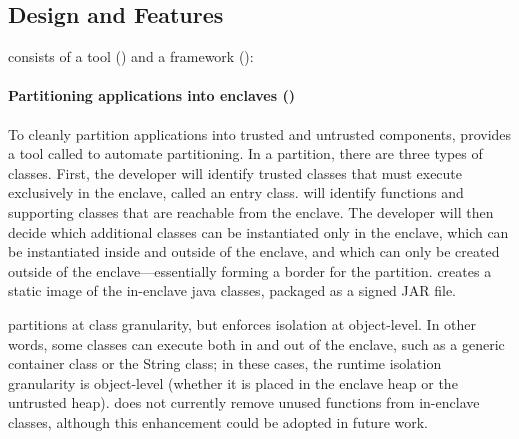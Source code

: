 \subsection{Design and Features}

\sysname{} consists of a \staticphase{} tool (\statictool{}) and a \dynamicphase{} framework (\dynamicframework{}):

\paragraph{Partitioning \java{} applications into enclaves (\statictool{})}
To cleanly partition \java{} applications into
 trusted and untrusted components,
 \sysname{} provides a \staticphase{} tool called \statictool{}
 to automate partitioning.
 In a \sysname{} partition, there are three types of classes.
 First, the developer will identify trusted classes that must execute
 exclusively in the enclave, called an entry class.
 \statictool{}  will identify functions and supporting classes that are reachable
 from the enclave.
 The developer will then decide which additional classes can be instantiated
 only in the enclave, which can be instantiated inside and outside of the enclave, and
 which can only be created outside of the enclave---essentially forming a border
 for the partition.
 \statictool{} creates a static image of the in-enclave java classes, packaged as a signed JAR file.
 
 \sysname{} partitions at class granularity, but enforces isolation at  object-level.
 In other words, some classes can execute both in and out of the enclave,
 such as a generic container class or the String class; in these cases,
 the runtime isolation granularity is  object-level (whether it is placed
 in the enclave heap or the untrusted heap).
 \sysname{} does not currently remove unused functions from in-enclave classes,
 although this enhancement could be adopted in future work.
  



